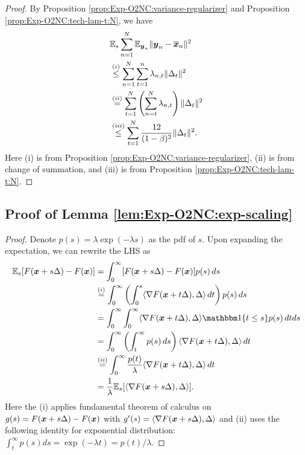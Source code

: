 \begin{proof}
By Proposition \ref{prop:Exp-O2NC:variance-regularizer} and Proposition \ref{prop:Exp-O2NC:tech-lam-t:N}, we have
\begin{align*}
    &\mathbb{E}_s\sum_{n=1}^N\mathbb{E}_{{\boldsymbol{y}}_n} \|{\boldsymbol{y}}_n-\overline{{\boldsymbol{x}}}_n\|^2 \\
    &\stackrel{(i)}{\le} \sum_{n=1}^N\sum_{t=1}^n \lambda_{n,t}\|\Delta_t\|^2 \\
    &\stackrel{(ii)}{=} \sum_{t=1}^N\left(\sum_{n=t}^N \lambda_{n,t}\right) \|\Delta_t\|^2 \\
    &\stackrel{(iii)}{\le} \sum_{t=1}^N \frac{12}{(1-\beta)^2} \|\Delta_t\|^2. 
\end{align*}
Here (i) is from Proposition \ref{prop:Exp-O2NC:variance-regularizer}, (ii) is from change of summation, and (iii) is from Proposition \ref{prop:Exp-O2NC:tech-lam-t:N}.
\end{proof}



\subsection{Proof of Lemma \ref{lem:Exp-O2NC:exp-scaling}}

\ExponentialScaling*
\begin{proof}
Denote $p(s)=\lambda\exp(-\lambda s)$ as the pdf of $s$. Upon expanding the expectation, we can rewrite the LHS as
\begin{align*}
    \Ex_s [F(\vecx+s\Delta) - F(\vecx)] 
    &= \int_0^\infty [F(\vecx+s\Delta) - F(\vecx)] p(s) \, ds \\
    &\stackrel{(i)}{=} \int_0^\infty \left( \int_0^s \langle \nabla F(\vecx+t\Delta), \Delta\rangle \, dt \right) p(s)\, ds \\
    &= \int_0^\infty\int_0^\infty \langle \nabla F(\vecx+t\Delta), \Delta\rangle \one\{t\le s\}p(s) \, dtds \\
    &= \int_0^\infty \left(\int_t^\infty p(s)\, ds\right) \langle \nabla F(\vecx+t\Delta),\Delta\rangle \, dt \\
    &\stackrel{(ii)}{=} \int_0^\infty \frac{p(t)}{\lambda} \langle \nabla F(\vecx+t\Delta),\Delta\rangle \, dt \\
    &= \frac{1}{\lambda} \Ex_s [\langle\nabla F(\vecx+s\Delta), \Delta\rangle].
\end{align*}
Here the (i) applies fundamental theorem of calculus on $g(s)=F({\boldsymbol{x}}+s\Delta)-F({\boldsymbol{x}})$ with $g'(s)=\langle \nabla F({\boldsymbol{x}}+s\Delta),\Delta\rangle$ and (ii) uses the following identity for exponential distribution: $\int_t^\infty p(s) ds = \exp(-\lambda t) = p(t)/\lambda$.
\end{proof}

